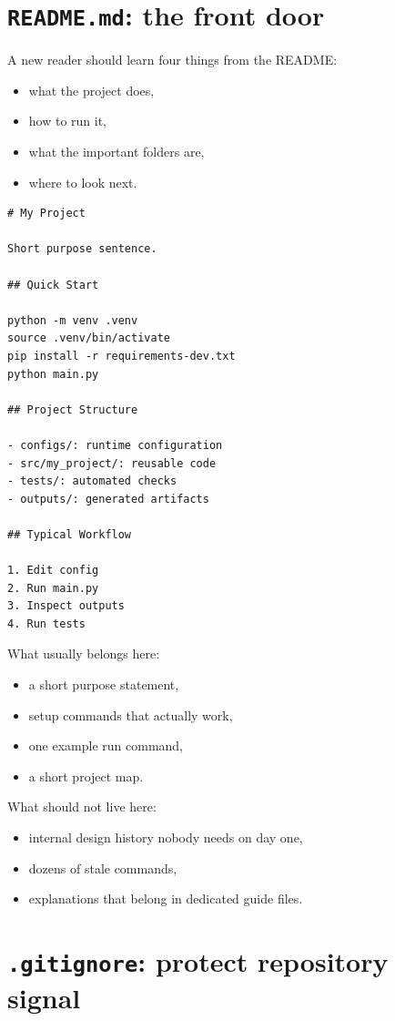 \documentclass[11pt,oneside]{book}
\begin{document}
\section*{\texttt{README.md}: the front door}

A new reader should learn four things from the README:
\begin{itemize}
  \item what the project does,
  \item how to run it,
  \item what the important folders are,
  \item where to look next.
\end{itemize}

\begin{lstlisting}[style=bookcode]
# My Project

Short purpose sentence.

## Quick Start

python -m venv .venv
source .venv/bin/activate
pip install -r requirements-dev.txt
python main.py

## Project Structure

- configs/: runtime configuration
- src/my_project/: reusable code
- tests/: automated checks
- outputs/: generated artifacts

## Typical Workflow

1. Edit config
2. Run main.py
3. Inspect outputs
4. Run tests
\end{lstlisting}

What usually belongs here:
\begin{itemize}
  \item a short purpose statement,
  \item setup commands that actually work,
  \item one example run command,
  \item a short project map.
\end{itemize}

What should not live here:
\begin{itemize}
  \item internal design history nobody needs on day one,
  \item dozens of stale commands,
  \item explanations that belong in dedicated guide files.
\end{itemize}

\section*{\texttt{.gitignore}: protect repository signal}
\end{document}

